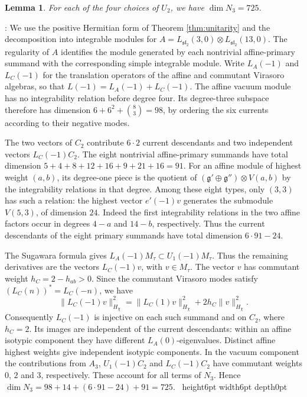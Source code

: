 \documentclass[leqno]{article}
\newcommand{\qed}{\hfill \vrule height6pt  width6pt depth0pt}
\newcommand{\ot}{\otimes}
\newtheorem{lemma}[thm]{Lemma}
\newenvironment{proof}[1][]{\noindent {\it Proof #1} : }{\hbox{~}\qed
\smallskip
}
\numberwithin{equation}{section}
\begin{document}
\begin{lemma}
\label{lem:normal-weight-three-dimension}
For each of the four choices of $U_2$, we have $\dim N_3 = 725$.
\end{lemma}

\begin{proof}
We use the positive Hermitian form of Theorem \ref{thm:unitarity} and the decomposition into integrable modules for $A = L_{\mathfrak{sl}_2}(3,0) \ot L_{\mathfrak{sl}_2}(13,0)$. The regularity of $A$ identifies the module generated by each nontrivial affine-primary summand with the corresponding simple integrable module. Write $L_A(-1)$ and $L_C(-1)$ for the translation operators of the affine and commutant Virasoro algebras, so that $L(-1) = L_A(-1)+L_C(-1)$. The affine vacuum module has no integrability relation before degree four. Its degree-three subspace therefore has dimension $6+6^2+\binom{8}{3} = 98$, by ordering the six currents according to their negative modes.

The two vectors of $C_2$ contribute $6\cdot 2$ current descendants and two independent vectors $L_C(-1)C_2$. The eight nontrivial affine-primary summands have total dimension $5+4+8+12+16+9+21+16 = 91$. For an affine module of highest weight $(a,b)$, its degree-one piece is the quotient of $(\mathfrak g' \oplus \mathfrak g'') \ot V(a,b)$ by the integrability relations in that degree. Among these eight types, only $(3,3)$ has such a relation: the highest vector $e'(-1)v$ generates the submodule $V(5,3)$, of dimension $24$. Indeed the first integrability relations in the two affine factors occur in degrees $4-a$ and $14-b$, respectively. Thus the current descendants of the eight primary summands have total dimension $6\cdot 91-24$.

The Sugawara formula gives $L_A(-1)M_\tau \subset U_1(-1)M_\tau$. Thus the remaining derivatives are the vectors $L_C(-1)v$, with $v \in M_\tau$. The vector $v$ has commutant weight $h_C = 2-h_{ab} > 0$. Since the commutant Virasoro modes satisfy $(L_C(n))^* = L_C(-n)$, we have
\[
\|L_C(-1)v\|_{H_\chi}^2 = \|L_C(1)v\|_{H_\chi}^2 + 2h_C\|v\|_{H_\chi}^2.
\]
Consequently $L_C(-1)$ is injective on each such summand and on $C_2$, where $h_C = 2$. Its images are independent of the current descendants: within an affine isotypic component they have different $L_A(0)$-eigenvalues. Distinct affine highest weights give independent isotypic components. In the vacuum component the contributions from $A_3$, $U_1(-1)C_2$ and $L_C(-1)C_2$ have commutant weights $0$, $2$ and $3$, respectively. These account for all terms of $N_3$. Hence $\dim N_3 = 98+14+(6\cdot 91-24)+91 = 725$.
\end{proof}
\end{document}
